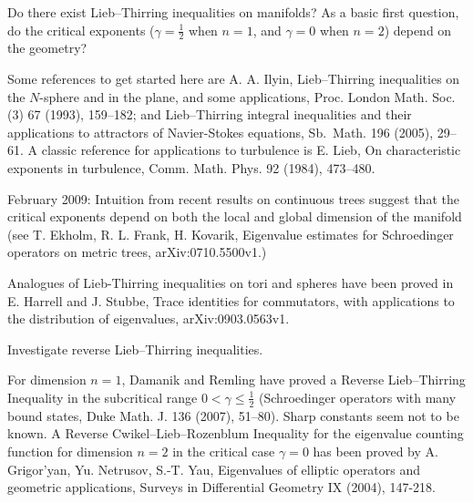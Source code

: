 \documentclass[12pt,letterpaper, reqno]{amsart}
\begin{document}
\begin{problemblock} 
\begin{problem}[2.66] 
Do there exist Lieb--Thirring inequalities on manifolds?
As a basic first question, do the critical exponents
($\gamma=\frac{1}{2}$ when $n=1$, and $\gamma=0$ when $n=2$) depend
on the geometry?
\end{problem}

\begin{remark}
Some references to get started here are A. A. Ilyin,
Lieb--Thirring inequalities on the $N$-sphere and in the
plane, and some applications, Proc. London Math. Soc. (3) 67
(1993), 159--182; and Lieb--Thirring integral inequalities and
their applications to attractors of Navier-Stokes equations, Sb.\
Math. 196 (2005), 29--61. A classic reference for applications to
turbulence is E. Lieb, On characteristic exponents in
turbulence, Comm. Math. Phys. 92 (1984), 473--480.
\end{remark}

\begin{remark}
February 2009: Intuition from recent results on continuous trees
suggest that the critical exponents depend on both the local and global
dimension of the manifold (see T. Ekholm, R. L. Frank, H. Kovarik,
Eigenvalue estimates for Schroedinger operators on metric trees,
arXiv:0710.5500v1.)
\end{remark}

\begin{remark}
Analogues of Lieb-Thirring inequalities on tori and spheres have been proved in E. Harrell and J. Stubbe, Trace identities for commutators, with applications to the distribution of eigenvalues,    arXiv:0903.0563v1.
\end{remark}

\end{problemblock}


\begin{problemblock}  
\begin{problem}[2.7]
Investigate reverse Lieb--Thirring inequalities.
\end{problem}

\begin{distinguishedremark}
For dimension $n=1$, Damanik and Remling have proved a
Reverse Lieb--Thirring Inequality in the subcritical range $0 <
\gamma \leq \frac{1}{2}$ (Schroedinger operators
with many bound states, Duke Math. J. 136 (2007), 51--80).  Sharp constants
seem not to be known. A Reverse
Cwikel--Lieb--Rozenblum Inequality for the eigenvalue counting function for dimension $n=2$ in the critical case $\gamma=0$ has been proved by A. Grigor'yan, Yu. Netrusov, S.-T. Yau, Eigenvalues of elliptic operators and geometric applications, Surveys in Differential Geometry IX (2004), 147-218.
\end{distinguishedremark}

\end{problemblock}
\end{document}
